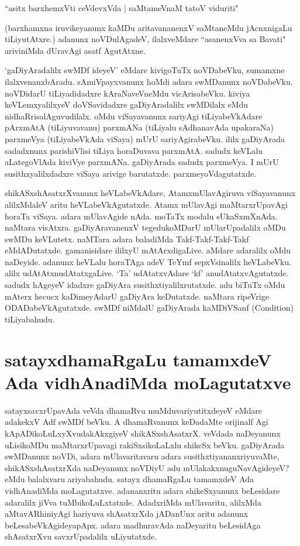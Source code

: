 \begin{shloka}
``asitx barxhemxVti ceVdevxVda | saMtameVnaM tatoV viduriti"\label{24}
\end{shloka}

(barxhamxna iruvikeyanunx kaMDu aritavananenxV saMtaneMdu jAcnxnigaLu tiLiyutAtxre.) adanunx noVDulAgadeV, ilalxveMdare ``asanenxVva sa Bavati"\label{24a} ariviniMda dUravAgi asatf AgutAtxne.

`gaDiyAradalilx swMDf ideyeV' eMdare kivigoTuTx noVDabeVku, sumamxne ilalxvenanxbAradu. sAmiVpayxvanunx hoMdi adara swMDanunx noVDabeVku. noVDidarU tiLiyadidadxre kAraNaveVneMdu vicArisabeVku. kiviya keVLemxyalilxyeV doVSavidadxre gaDiyAradalilx swMDilalx eMdu nidhaRrisalAguvudilalx. oMdu viSayavanunx sariyAgi tiLiyabeVkAdare pArxmAtA (tiLiyuvavanu) parxmANa (tiLiyalu sAdhanavAda upakaraNa) parxmeVya (tiLiyabeVkAda viSaya) mUrU sariyAgirabeVku. ililx gaDiyArada sadadxnunx parishiVlisi tiLiya horaDuvava parxmAtA. sadudx keVLalu aLategoVlAda kiviVye parxmANa. gaDiyArada sadudx parxmeVya. I mUrU susithxyalilxdadxre viSaya arivige barutatxde. parxmeyoVdagutatxde.

shikASxshAsatxrXvanunx heVLabeVkAdare, AtamxmUlavAgiruva viSayavanunx alilxMdaleV aritu heVLabeVkAgutatxde. Atamx mUlavAgi maMtarxrUpavAgi horaTa viSaya. adara mUlavAgide nAda. moTaTx modalu sUkaSxmXnAda. naMtara visAtxra. gaDiyAravanenxV tegedukoMDarU mUlarUpadalilx oMDu swMDu keVLutetx. naMTara adara baladiMda Takf-Takf-Takf-Takf eMdADutatxde. gamanisidare ililxyU mAtArxdigaLive. aMdare adaralilx oMdu naDeyide. adanunx  heVLalu horaTAga adeV TeYmf sepxVsinalilx heVLabeVku. alilx udAtAtxnudAtatxgaLive. `Ta' udAtatxvAdare `kf' anudAtatxvAgutatxde. sadudx hAgeyeV idadxre gaDiyAra susithxtiyalilxrutatxde. adu biTuTx oMdu mAterx hecucx kaDimeyAdarU gaDiyAra keDutatxde. naMtara ripeVrige ODADabeVkAgutatxde. swMDf niMdalU gaDiyArada kaMDiVSanf {(\eng Condition)} tiLiyabahudu.

\section*{satayxdhamaRgaLu tamamxdeV Ada vidhAnadiMda moLagutatxve}

 satayxsavxrUpavAda  veVda dhamaRvu muMduvariyutitxdeyeV eMdare adakekxV Adf swMDf beVku. A dhamaRvanunx keDadaMte orijinalf Agi kApADikoLuLxyXvudakAkxgiyeV shikASxshAsatxrX. veVdada naDeyanunx uLisikoMDu maMtarxrUpavagi rakiSxsikoLaLxlu shikeSx beVku. gaDiyArada swMDanunx noVDi, adara mUlavaritavaru adara susithxtiyananxriyuvaMte, shikASxshAsatxrXda naDeyanunx noVDiyU adu mUlakakxnuguNavAgideyeV? eMdu balalxvaru ariyabahudu. satayx dhamaRgaLu tamamxdeV Ada vidhAnadiMda moLagutatxve. adananxritu adara shikeSxyanunx beLesidare adaralilx jiVva tuMbikoLuLxtatxde. AdadxriMda mUlavaritu, alilxMda aMtavARhiniyAgi hariyuva shAsatxrXda jADanUnx aritu adanunx beLesabeVkAgideyapApx. adara madhuravAda naDeyaritu beLesidAga shAsatxrXvu savxrUpadalilx uLiyutatxde.

